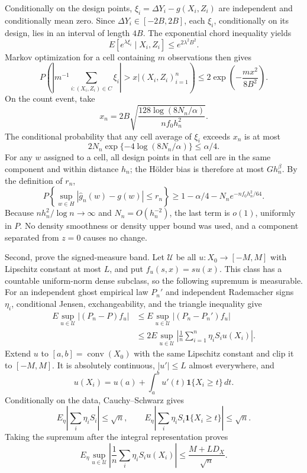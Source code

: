 Conditionally on the design points, \(\xi_i=\Delta Y_i-g(X_i,Z_i)\) are independent and conditionally mean zero.  Since \(\Delta Y_i\in[-2B,2B]\), each \(\xi_i\), conditionally on its design, lies in an interval of length \(4B\).  The exponential chord inequality yields
\[
 E[e^{\lambda\xi_i}\mid X_i,Z_i]\leq e^{2\lambda^2B^2}.
\]
Markov optimization for a cell containing \(m\) observations then gives
\[
 P\!\left(\left|m^{-1}\sum_{i:(X_i,Z_i)\in C}\xi_i\right|>x
 \mathrel{\Big|}(X_i,Z_i)_{i=1}^n\right)
 \leq2\exp\!\left(-\frac{mx^2}{8B^2}\right).
\]
On the count event, take
\[
 x_n=2B\sqrt{\frac{128\log(8N_n/\alpha)}{nf_0h_n^2}}.
\]
The conditional probability that any cell average of \(\xi_i\) exceeds \(x_n\) is at most
\[
 2N_n\exp\{-4\log(8N_n/\alpha)\}\leq\alpha/4.
\]
For any \(w\) assigned to a cell, all design points in that cell are in the same component and within distance \(h_n\); the H\"older bias is therefore at most \(Gh_n^\beta\).  By the definition of \(r_n\),
\[
 P\!\left\{\sup_{w\in H}|\widehat g_n(w)-g(w)|\leq r_n\right\}
 \geq1-\alpha/4-N_ne^{-nf_0h_n^2/64}.
\]
Because \(nh_n^2/\log n\to\infty\) and \(N_n=O(h_n^{-2})\), the last term is \(o(1)\), uniformly in \(P\).  No density smoothness or density upper bound was used, and a component separated from \(z=0\) causes no change.

Second, prove the signed-measure band.  Let \(\mathcal U\) be all \(u:X_0\to[-M,M]\) with Lipschitz constant at most \(L\), and put \(f_u(s,x)=su(x)\).  This class has a countable uniform-norm dense subclass, so the following supremum is measurable.  For an independent ghost empirical law \(P_n'\) and independent Rademacher signs \(\eta_i\), conditional Jensen, exchangeability, and the triangle inequality give
\[
 \begin{aligned}
 E\sup_{u\in\mathcal U}|(P_n-P)f_u|
 &\leq E\sup_{u\in\mathcal U}|(P_n-P_n')f_u|\\
 &\leq2E\sup_{u\in\mathcal U}
 \left|\frac1n\sum_{i=1}^n\eta_iS_iu(X_i)\right|.
 \end{aligned}
\]
Extend \(u\) to \([a,b]=\operatorname{conv}(X_0)\) with the same Lipschitz constant and clip it to \([-M,M]\).  It is absolutely continuous, \(|u'|\leq L\) almost everywhere, and
\[
 u(X_i)=u(a)+\int_a^b u'(t)\mathbf1\{X_i\geq t\}\,dt.
\]
Conditionally on the data, Cauchy--Schwarz gives
\[
 E_\eta\left|\sum_i\eta_iS_i\right|\leq\sqrt n,
 \qquad
 E_\eta\left|\sum_i\eta_iS_i\mathbf1\{X_i\geq t\}\right|\leq\sqrt n.
\]
Taking the supremum after the integral representation proves
\[
 E_\eta\sup_{u\in\mathcal U}
 \left|\frac1n\sum_i\eta_iS_iu(X_i)\right|
 \leq\frac{M+LD_X}{\sqrt n}.
\]

